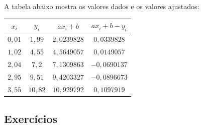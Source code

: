 \begin{sol}
A tabela abaixo mostra os valores dados e os valores ajustados:
\begin{center}
\begin{tabular}{|c|c|c|c|}
\hline
$x_i$ & $y_i$& $ax_i+b$& $ax_i+b-y_i$\\
\hline
$0,01$ & $1,99$ & $2,0239828$ & $0,0339828$\\
$1,02$ & $4,55$ & $4,5649057$ & $0,0149057$ \\
$2,04$ & $7,2$ & $7,1309863$ & $-0,0690137$ \\
$2,95$ & $9,51$ & $9,4203327$ & $-0,0896673$  \\
$3,55$ & $10,82$ & $10,929792$ & $0,1097919$ \\
\hline
\end{tabular}  
\end{center}
\end{sol}

\subsection*{Exercícios}

